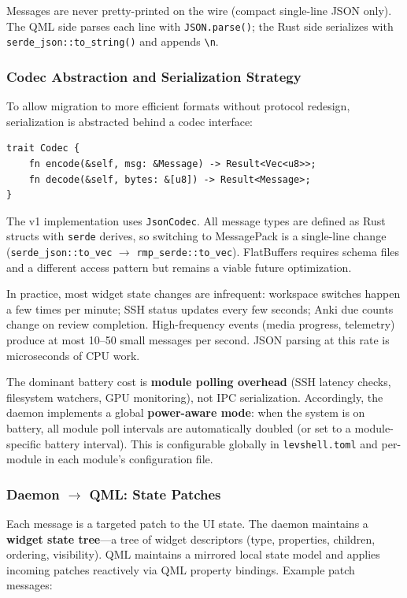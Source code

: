 \documentclass[11pt,a4paper]{article}
\begin{document}
Messages are never pretty-printed on the wire (compact single-line JSON only). The QML side parses each line with \texttt{JSON.parse()}; the Rust side serializes with \texttt{serde\_json::to\_string()} and appends \texttt{\textbackslash n}.

\subsubsection{Codec Abstraction and Serialization Strategy}

To allow migration to more efficient formats without protocol redesign, serialization is abstracted behind a codec interface:

\begin{lstlisting}[language={}]
trait Codec {
    fn encode(&self, msg: &Message) -> Result<Vec<u8>>;
    fn decode(&self, bytes: &[u8]) -> Result<Message>;
}
\end{lstlisting}

The v1 implementation uses \texttt{JsonCodec}. All message types are defined as Rust structs with \texttt{serde} derives, so switching to MessagePack is a single-line change (\texttt{serde\_json::to\_vec} $\to$ \texttt{rmp\_serde::to\_vec}). FlatBuffers requires schema files and a different access pattern but remains a viable future optimization.

\begin{notebox}
In practice, most widget state changes are infrequent: workspace switches happen a few times per minute; SSH status updates every few seconds; Anki due counts change on review completion. High-frequency events (media progress, telemetry) produce at most 10--50 small messages per second. JSON parsing at this rate is microseconds of CPU work.

The dominant battery cost is \textbf{module polling overhead} (SSH latency checks, filesystem watchers, GPU monitoring), not IPC serialization. Accordingly, the daemon implements a global \textbf{power-aware mode}: when the system is on battery, all module poll intervals are automatically doubled (or set to a module-specific battery interval). This is configurable globally in \texttt{levshell.toml} and per-module in each module's configuration file.
\end{notebox}

\subsubsection{Daemon $\to$ QML: State Patches}
Each message is a targeted patch to the UI state. The daemon maintains a \textbf{widget state tree}---a tree of widget descriptors (type, properties, children, ordering, visibility). QML maintains a mirrored local state model and applies incoming patches reactively via QML property bindings. Example patch messages:
\end{document}
